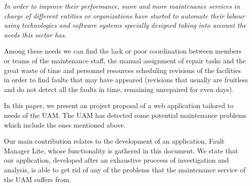 
\itshape
In order to improve their performance, more and more maintenance services in charge of different entities or organizations have started to automate their labour using technologies and software systems specially designed taking into account the needs this sector has.

Among these needs we can find the lack or poor coordination between members or teams of the maintenance staff, the manual assignment of repair tasks and the great waste of time and personnel resources scheduling revisions of the facilities in order to find faults that may have appeared (revisions that usually are fruitless and do not detect all the faults in time, remaining unrepaired for even days).

In this paper, we present an project proposal of a web application tailored to needs of the UAM. The UAM has detected some potential maintenance problems which include the ones mentioned above.

Our main contribution relates to the development of an application, Fault Manager Lite, whose functionality is gathered in this document. We state that our application, developed after an exhaustive proccess of investigation and analysis, is able to get rid of any of the problems that the maintenance service of the UAM suffers from.

\upshape
